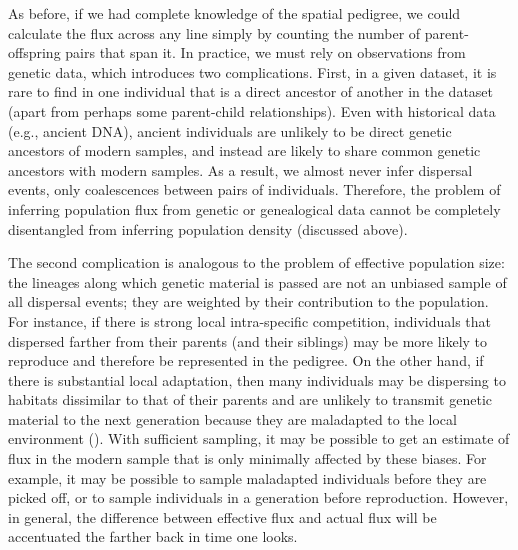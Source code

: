 \documentclass{ar-1col}
\begin{document}
As before, if we had complete knowledge of the spatial pedigree,
we could calculate the flux across any line simply by counting the number of
parent-offspring pairs that span it.
In practice, we must rely on observations from genetic data,
which introduces two complications.
First, in a given dataset, it is rare to find in one individual
that is a direct ancestor of another in the dataset
(apart from perhaps some parent-child relationships).
Even with historical data (e.g., ancient DNA),
ancient individuals are unlikely to be direct genetic ancestors of modern samples,
and instead are likely to share common genetic ancestors with modern samples.
As a result, we almost never infer dispersal events,
only coalescences between pairs of individuals.
Therefore, the problem of inferring population flux from genetic or genealogical data
cannot be completely disentangled from inferring population density (discussed above).

The second complication is analogous to the problem of effective population size:
the lineages along which genetic material is passed are not an unbiased sample of all dispersal events;
they are weighted by their contribution to the population.
For instance, if there is strong local intra-specific competition,
individuals that dispersed farther from their parents (and their siblings)
may be more likely to reproduce and therefore be represented in the pedigree.
On the other hand, if there is substantial local adaptation,
then many individuals may be dispersing to habitats dissimilar to that of their parents
and are unlikely to transmit genetic material to the next generation
because they are maladapted to the local environment
(\citep[for a review, see][]{wangbradburd2014}).
With sufficient sampling,
it may be possible to get an estimate of flux in the modern sample
that is only minimally affected by these biases.
For example, it may be possible to sample maladapted individuals
before they are picked off,
or to sample individuals in a generation before reproduction.
However, in general, the difference between effective flux and actual flux
will be accentuated the farther back in time one looks.

\end{document}
